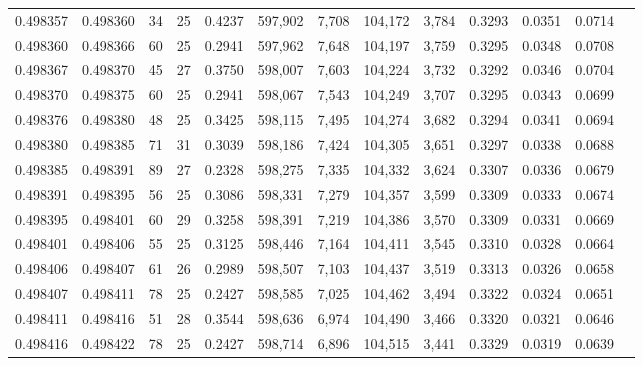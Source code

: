 \begin{tabular}{rrrrrrrrrrrrr}
0.498357 & 0.498360 &  34 &  25 &                                     0.4237 & 597,902 &   7,708 & 104,172 &   3,784 & 0.3293 & 0.0351 & 0.0714 \\
0.498360 & 0.498366 &  60 &  25 &                                     0.2941 & 597,962 &   7,648 & 104,197 &   3,759 & 0.3295 & 0.0348 & 0.0708 \\
0.498367 & 0.498370 &  45 &  27 &                                     0.3750 & 598,007 &   7,603 & 104,224 &   3,732 & 0.3292 & 0.0346 & 0.0704 \\
0.498370 & 0.498375 &  60 &  25 &                                     0.2941 & 598,067 &   7,543 & 104,249 &   3,707 & 0.3295 & 0.0343 & 0.0699 \\
0.498376 & 0.498380 &  48 &  25 &                                     0.3425 & 598,115 &   7,495 & 104,274 &   3,682 & 0.3294 & 0.0341 & 0.0694 \\
0.498380 & 0.498385 &  71 &  31 &                                     0.3039 & 598,186 &   7,424 & 104,305 &   3,651 & 0.3297 & 0.0338 & 0.0688 \\
0.498385 & 0.498391 &  89 &  27 &                                     0.2328 & 598,275 &   7,335 & 104,332 &   3,624 & 0.3307 & 0.0336 & 0.0679 \\
0.498391 & 0.498395 &  56 &  25 &                                     0.3086 & 598,331 &   7,279 & 104,357 &   3,599 & 0.3309 & 0.0333 & 0.0674 \\
0.498395 & 0.498401 &  60 &  29 &                                     0.3258 & 598,391 &   7,219 & 104,386 &   3,570 & 0.3309 & 0.0331 & 0.0669 \\
0.498401 & 0.498406 &  55 &  25 &                                     0.3125 & 598,446 &   7,164 & 104,411 &   3,545 & 0.3310 & 0.0328 & 0.0664 \\
0.498406 & 0.498407 &  61 &  26 &                                     0.2989 & 598,507 &   7,103 & 104,437 &   3,519 & 0.3313 & 0.0326 & 0.0658 \\
0.498407 & 0.498411 &  78 &  25 &                                     0.2427 & 598,585 &   7,025 & 104,462 &   3,494 & 0.3322 & 0.0324 & 0.0651 \\
0.498411 & 0.498416 &  51 &  28 &                                     0.3544 & 598,636 &   6,974 & 104,490 &   3,466 & 0.3320 & 0.0321 & 0.0646 \\
0.498416 & 0.498422 &  78 &  25 &                                     0.2427 & 598,714 &   6,896 & 104,515 &   3,441 & 0.3329 & 0.0319 & 0.0639 \\

\end{tabular}
